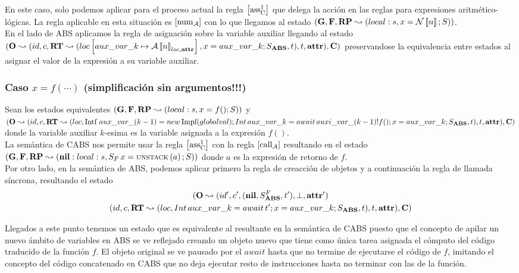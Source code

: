 En este caso, solo podemos aplicar para el proceso actual la regla $\left[ \text{ass}_{\text{C}}^{1} \right]$ que delega la acción en las reglas para expresiones aritmético-lógicas. La regla aplicable en esta situación es $\left[ \text{num}_{\mathcal{A}} \right]$ con lo que llegamos al estado $(\mathbf{G}, \mathbf{F}, \textbf{RP} \leadsto (local:s,x = \mathcal{N}\left\llbracket n \right\rrbracket\mbox{;\,}S))$.\\

En el lado de ABS aplicamos la regla de asignación sobre la variable auxiliar llegando al estado $(\mathbf{O} \leadsto (id, c, \textbf{RT} \leadsto (loc \left[ aux\_var\_k\mapsto\mathcal{A} \left\llbracket n \right\rrbracket_{loc, \textbf{attr}} \right], x = aux\_var\_k\mbox{;\,}S_{\textbf{ABS}}, t), t, \textbf{attr}), \mathbf{C})$ preservandose la equivalencia entre estados al asignar el valor de la expresión a su variable auxiliar.

\subsubsection{Caso $x = f(\cdots)$ (simplificación sin argumentos!!!)}
Sean los estados equivalentes $(\mathbf{G}, \mathbf{F}, \textbf{RP} \leadsto (local:s,x = f()\mbox{;\,}S))$ y $(\mathbf{O} \leadsto (id, c, \textbf{RT} \leadsto (loc, \mbox{Intf }  aux\_var\_(k-1) = new\, \mbox{Impf}(globalval) \mbox{;\,} Int\, aux\_var\_k = await\,auxi\_var\_(k-1)!f()\mbox{;\,} x = aux\_var\_k\mbox{;\,} S_{\textbf{ABS}}, t), t, \textbf{attr}), \mathbf{C})$ donde la variable auxiliar $k$-esima es la variable asignada a la expresión $f()$.\\

La semántica de CABS nos permite usar la regla $\left[ \text{ass}_{\text{C}}^{1} \right]$ con la regla $\left[ \text{call}_{\mathcal{A}} \right]$ resultando en el estado $(\mathbf{G}, \mathbf{F}, \textbf{RP} \leadsto (\textbf{nil}:local:s, S_F\,x = \text{\scriptsize{UNSTACK}}\left(a\right)\mbox{;\,}S))$ donde $a$ es la expresión de retorno de $f$.\\

Por otro lado, en la semántica de ABS, podemos aplicar primero la regla de creacción de objetos y a continuación la regla de llamada síncrona, resultando el estado
\begin{multline*}
  (\mathbf{O} \leadsto (id', c', (\textbf{nil}, S_{\textbf{ABS}}^F, t'), \perp, \textbf{attr}')\\
  (id, c, \textbf{RT} \leadsto (loc, Int\, aux\_var\_k = await\,t'\mbox{;\,} x = aux\_var\_k\mbox{;\,} S_{\textbf{ABS}}, t), t, \textbf{attr}), \mathbf{C})
\end{multline*}

Llegados a este punto tenemos un estado que es equivalente al resultante en la semántica de CABS puesto que el concepto de apilar un nuevo ámbito de variables en ABS se ve reflejado creando un objeto nuevo que tiene como única tarea asignada el cómputo del código traducido de la función $f$. El objeto original se ve pausado por el $await$ hasta que no termine de ejecutarse el código de $f$, imitando el concepto del código concatenado en CABS que no deja ejecutar resto de instrucciones hasta no terminar con las de la función.\\

